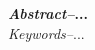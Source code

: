\documentclass[../report.tex]{subfiles}
\begin{document}
{\textbf{\textit{Abstract--}...}} \\

\textit{Keywords--}...
\end{document}
